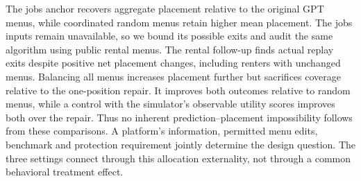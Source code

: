 The jobs anchor recovers aggregate placement relative to the original GPT menus, while coordinated random menus retain higher mean placement. The jobs inputs remain unavailable, so we bound its possible exits and audit the same algorithm using public rental menus. The rental follow-up finds actual replay exits despite positive net placement changes, including renters with unchanged menus. Balancing all menus increases placement further but sacrifices coverage relative to the one-position repair. It improves both outcomes relative to random menus, while a control with the simulator's observable utility scores improves both over the repair. Thus no inherent prediction--placement impossibility follows from these comparisons. A platform's information, permitted menu edits, benchmark and protection requirement jointly determine the design question. The three settings connect through this allocation externality, not through a common behavioral treatment effect.

